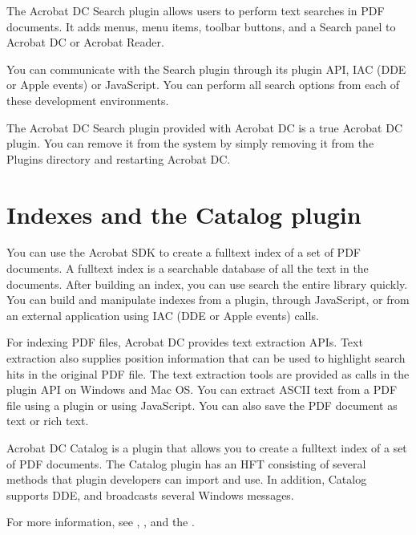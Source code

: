 \documentclass[letterpaper,12pt,english,openany,oneside]{sphinxmanual}
\begin{document}
The Acrobat DC Search plug\sphinxhyphen{}in allows users to perform text searches in PDF documents. It adds menus, menu items, toolbar buttons, and a Search panel to Acrobat DC or Acrobat Reader.

You can communicate with the Search plug\sphinxhyphen{}in through its plug\sphinxhyphen{}in API, IAC (DDE or Apple events) or JavaScript. You can perform all search options from each of these development environments.

The Acrobat DC Search plug\sphinxhyphen{}in provided with Acrobat DC is a true Acrobat DC plug\sphinxhyphen{}in. You can remove it from the system by simply removing it from the Plug\sphinxhyphen{}ins directory and restarting Acrobat DC.




\section{Indexes and the Catalog plug\sphinxhyphen{}in}
\label{\detokenize{Overview_Searching:indexes-and-the-catalog-plug-in}}
You can use the Acrobat SDK to create a full\sphinxhyphen{}text index of a set of PDF documents. A full\sphinxhyphen{}text index is a searchable database of all the text in the documents. After building an index, you can use search the entire library quickly. You can build and manipulate indexes from a plug\sphinxhyphen{}in, through JavaScript, or from an external application using IAC (DDE or Apple events) calls.

For indexing PDF files, Acrobat DC provides text extraction APIs. Text extraction also supplies position information that can be used to highlight search hits in the original PDF file. The text extraction tools are provided as calls in the plug\sphinxhyphen{}in API on Windows and Mac OS. You can extract ASCII text from a PDF file using a plug\sphinxhyphen{}in or using JavaScript. You can also save the PDF document as text or rich text.

Acrobat DC Catalog is a plug\sphinxhyphen{}in that allows you to create a full\sphinxhyphen{}text index of a set of PDF documents. The Catalog plug\sphinxhyphen{}in has an HFT consisting of several methods that plug\sphinxhyphen{}in developers can import and use. In addition, Catalog supports DDE, and broadcasts several Windows messages.

For more information, see  ,  , and the  .
\end{document}
